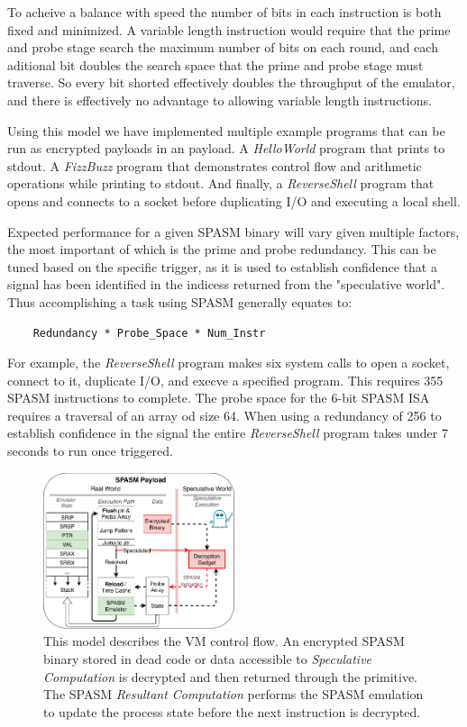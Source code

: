To acheive a balance with speed the number of bits in each instruction is both 
fixed and minimized.  A variable length instruction would require that the prime
and probe stage search the maximum number of bits on each round, and each 
aditional bit doubles the search space that the prime and probe stage must 
traverse.  So every bit shorted effectively doubles the throughput of the 
emulator, and there is effectively no advantage to allowing variable length 
instructions. 

Using this model we have implemented multiple example programs that can be run
as encrypted payloads in an \speculake payload. A \textit{HelloWorld} program 
that prints to stdout. A \textit{FizzBuzz} program that demonstrates control 
flow and arithmetic operations while printing to stdout. And finally,
a \textit{ReverseShell} program that opens and connects to a socket before  
duplicating I/O and executing a local shell. 

Expected performance for a given SPASM binary will vary given multiple factors, 
the most important of which is the prime and probe redundancy. This can be tuned
based on the specific trigger, as it is used to establish confidence that a signal 
has been identified in the indicess returned from the "speculative world". 
Thus accomplishing a task using SPASM generally equates to:

\begin{lstlisting}
    Redundancy * Probe_Space * Num_Instr
\end{lstlisting}

For example, the \textit{ReverseShell} program makes six system calls to open a socket,
connect to it, duplicate I/O, and execve a specified program. This requires 355
SPASM instructions to complete. The probe space for the 6-bit SPASM ISA requires 
a traversal of an array od size 64. When using a redundancy of 256 to establish
confidence in the signal the entire \textit{ReverseShell} program takes under 7 
seconds to run once triggered. 

\begin{figure}[b]
    \centering
        \includegraphics[width=0.5\textwidth]{figures/spasm_model}
    \caption{This model describes the VM control flow. An encrypted SPASM binary 
        stored in dead code or data accessible to \textit{Speculative Computation} 
        is decrypted  and then returned through the primitive. The SPASM 
        \textit{Resultant Computation} performs the SPASM emulation to update the 
        process state before the next instruction is decrypted.}
    \label{fig:spasm_model}
\end{figure}

